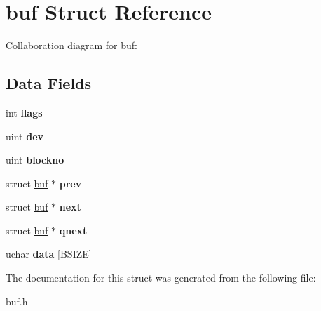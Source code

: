 \hypertarget{structbuf}{}\section{buf Struct Reference}
\label{structbuf}


Collaboration diagram for buf\+:
\subsection*{Data Fields}
\begin{DoxyCompactItemize}
\item 
int {\bfseries flags}\hypertarget{structbuf_ae7d6b6c34fdeadb38970efd0554aa1a9}{}\label{structbuf_ae7d6b6c34fdeadb38970efd0554aa1a9}

\item 
uint {\bfseries dev}\hypertarget{structbuf_ac96082c2b5f22133ac7092ef81487227}{}\label{structbuf_ac96082c2b5f22133ac7092ef81487227}

\item 
uint {\bfseries blockno}\hypertarget{structbuf_a756b2bcc88008bef7f21d688aa4a7a48}{}\label{structbuf_a756b2bcc88008bef7f21d688aa4a7a48}

\item 
struct \hyperlink{structbuf}{buf} $\ast$ {\bfseries prev}\hypertarget{structbuf_a930cab1e1b3751795d31bfd0291dff4a}{}\label{structbuf_a930cab1e1b3751795d31bfd0291dff4a}

\item 
struct \hyperlink{structbuf}{buf} $\ast$ {\bfseries next}\hypertarget{structbuf_ab18c18abb22f07617619e9a74c71f51a}{}\label{structbuf_ab18c18abb22f07617619e9a74c71f51a}

\item 
struct \hyperlink{structbuf}{buf} $\ast$ {\bfseries qnext}\hypertarget{structbuf_aba5c088c4da07a5ec88edfacdae9b85a}{}\label{structbuf_aba5c088c4da07a5ec88edfacdae9b85a}

\item 
uchar {\bfseries data} \mbox{[}B\+S\+I\+ZE\mbox{]}\hypertarget{structbuf_ab0ec38784ab94ed35e575cf6d33912d2}{}\label{structbuf_ab0ec38784ab94ed35e575cf6d33912d2}

\end{DoxyCompactItemize}


The documentation for this struct was generated from the following file\+:\begin{DoxyCompactItemize}
\item 
buf.\+h\end{DoxyCompactItemize}

